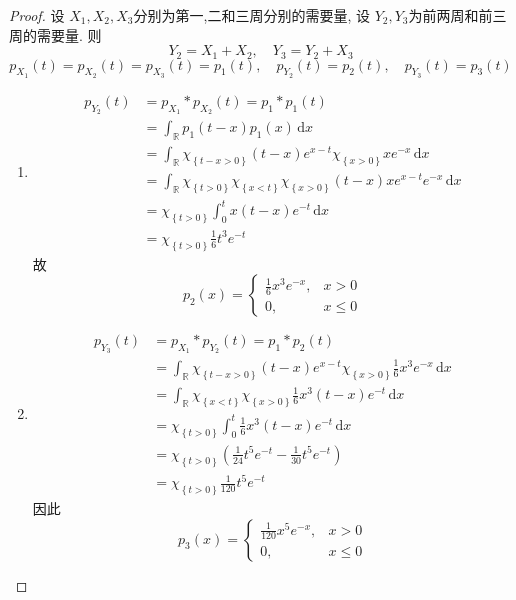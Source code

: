 \documentclass[../main.tex]{subfiles}
\begin{document}
\begin{proof}
    设 \(  X_1,X_2  ,X_3\)分别为第一,二和三周分别的需要量, 设 \(  Y_2,Y_3  \)为前两周和前三周的需要量. 则 \[
    Y_2= X_1+ X_2,\quad Y_3= Y_2+ X_3
    \] \[
    p_{X_1}\left( t \right)= p_{X_2}\left( t \right)= p_{X_3}\left( t \right)= p_1\left( t \right)    ,\quad p_{Y_2}\left( t \right)= p_2\left( t \right),\quad p_{Y_3}\left( t \right)= p_3\left( t \right)    
    \] 
    \begin{enumerate}
        \item  \[
       \begin{aligned}
        p_{Y_2}\left( t \right)&= p_{X_1}*p_{X_2}\left( t \right)  = p_{1}*p_1\left( t \right)\\ 
         &=  \int_{\mathbb{R} } p_1\left( t-x \right)p_1\left( x \right)\,\mathrm{d} x   \\ 
          &=  \int_{\mathbb{R} } \chi _{\left\{ t-x> 0 \right\}}\left( t-x \right)e^{x-t} \chi _{\left\{ x> 0 \right\}}xe^{-x}\,\mathrm{d} x\\ 
           &=  \int_{\mathbb{R} }\chi _{\left\{ t> 0 \right\}} \chi _{\left\{ x< t \right\}}\chi _{\left\{ x> 0 \right\}}\left( t-x \right)xe^{x-t}e^{-x}  \,\mathrm{d} x\\ 
            &= \chi _{\left\{ t> 0 \right\}} \int_{0}^{t}x\left( t-x \right)e^{-t}\,\mathrm{d} x\\ 
             &=  \chi _{\left\{ t> 0 \right\}}\frac{1}{6}t^{3}e^{-t}
       \end{aligned} 
        \]故 \[
        p_2\left( x \right)= \begin{cases} \frac{1}{6}x^{3}e^{-x},&x> 0\\ 
         0,& x\le 0 \end{cases}  
        \]
        \item \[
        \begin{aligned}
        p_{Y_3}\left( t \right)&= p_{X_1}*p_{Y_2}\left( t \right)= p_1*p_2\left( t \right)\\ 
         &=     \int_{\mathbb{R} }\chi _{\left\{ t-x> 0 \right\}}\left( t-x \right)e^{x-t} \chi _{\left\{ x> 0 \right\}}\frac{1}{6}x^{3}e^{-x}\,\mathrm{d} x\\ 
          &= \int_{\mathbb{R} } \chi _{\left\{ x< t \right\}}\chi _{\left\{ x> 0 \right\}}\frac{1}{6}x^{3}\left( t-x \right)e^{-t}\,\mathrm{d} x\\ 
           &= \chi _{\left\{ t> 0 \right\}}\int_{0}^{t}\frac{1}{6}x^{3}\left( t-x \right)e^{-t}\,\mathrm{d} x\\ 
            &= \chi _{\left\{ t> 0 \right\}} \left( \frac{1}{24}t^{5}e^{-t} - \frac{1}{30}t^{5}e^{-t}\right)   \\ 
             &=\chi _{\left\{ t> 0 \right\}} \frac{1}{120}t^{5}e^{-t} 
        \end{aligned}
        \]因此 \[
        p_3\left( x \right)= \begin{cases} \frac{1}{120}x^{5}e^{-x},&x> 0\\ 
         0,& x\le 0 \end{cases}  
        \]
    \end{enumerate}
    
\end{proof}
\end{document}
